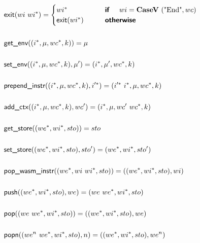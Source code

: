 \begin{align*}
  &\exit(wi ~ \seq{wi}) =
    \begin{cases}
      \seq{wi} &\quad\quad \premise{if}\quad ~ wi = \casev ~ (\text{"End"}, wc) \\
      \exit(\seq{wi}) &\quad\quad \premise{otherwise} \\
    \end{cases}
  \\
%
\newline \\
  &\getenv((\seq i, \mu, wc^*, k)) = \mu \\
%
\newline \\
  &\setenv((\seq i, \mu, wc^*, k), \mu') = (\seq i, \mu', wc^*, k) \\
%
\newline \\
  &\prependinstr((\seq i, \mu, wc^*, k), \seq{i'}) = (\seq{i'} ~ \seq i, \mu, wc^*, k) \\
%
\newline \\
  &\addctx((\seq i, \mu, wc^*, k), wc') = (\seq i, \mu, wc' ~ wc^*, k) \\
%
\newline \\
  &\getstore((\seq{we}, \seq{wi}, sto)) = sto \\
%
\newline \\
  &\setstore((\seq{we}, \seq{wi}, sto), sto') = (\seq{we}, \seq{wi}, sto') \\
%
\newline \\
  &\popwasminstr((\seq{we}, wi ~ \seq{wi}, sto)) = ((\seq{we}, \seq{wi}, sto), wi) \\
%
\newline \\
  &\push((\seq{we}, \seq{wi}, sto), we) = (we ~ \seq{we}, \seq{wi}, sto) \\
%
\newline \\
  &\pop((we ~ \seq{we}, \seq{wi}, sto)) = ((\seq{we}, \seq{wi}, sto), we) \\
%
\newline \\
  &\popn((we^n ~ \seq{we}, \seq{wi}, sto), n) = ((\seq{we}, \seq{wi}, sto), we^n) \\
%
\newline \\

\end{align*}
